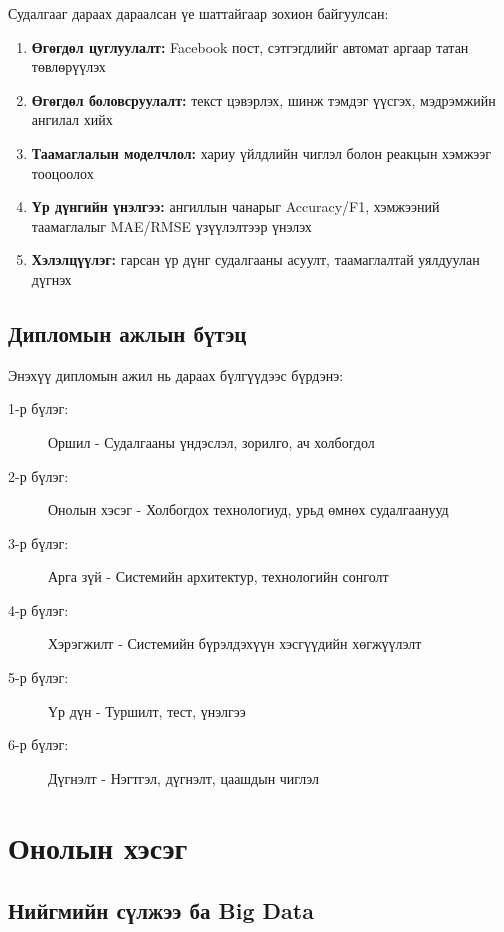 \documentclass[12pt,a4paper]{report}
\begin{document}
Судалгааг дараах дараалсан үе шаттайгаар зохион байгуулсан:

\begin{enumerate}
    \item \textbf{Өгөгдөл цуглуулалт:} Facebook пост, сэтгэгдлийг автомат аргаар татан төвлөрүүлэх
    \item \textbf{Өгөгдөл боловсруулалт:} текст цэвэрлэх, шинж тэмдэг үүсгэх, мэдрэмжийн ангилал хийх
    \item \textbf{Таамаглалын моделчлол:} хариу үйлдлийн чиглэл болон реакцын хэмжээг тооцоолох
    \item \textbf{Үр дүнгийн үнэлгээ:} ангиллын чанарыг Accuracy/F1, хэмжээний таамаглалыг MAE/RMSE үзүүлэлтээр үнэлэх
    \item \textbf{Хэлэлцүүлэг:} гарсан үр дүнг судалгааны асуулт, таамаглалтай уялдуулан дүгнэх
\end{enumerate}

\section{Дипломын ажлын бүтэц}

Энэхүү дипломын ажил нь дараах бүлгүүдээс бүрдэнэ:

\begin{description}
    \item[1-р бүлэг:] Оршил - Судалгааны үндэслэл, зорилго, ач холбогдол
    \item[2-р бүлэг:] Онолын хэсэг - Холбогдох технологиуд, урьд өмнөх судалгаанууд
    \item[3-р бүлэг:] Арга зүй - Системийн архитектур, технологийн сонголт
    \item[4-р бүлэг:] Хэрэгжилт - Системийн бүрэлдэхүүн хэсгүүдийн хөгжүүлэлт
    \item[5-р бүлэг:] Үр дүн - Туршилт, тест, үнэлгээ
    \item[6-р бүлэг:] Дүгнэлт - Нэгтгэл, дүгнэлт, цаашдын чиглэл
\end{description}

\chapter{Онолын хэсэг}

\section{Нийгмийн сүлжээ ба Big Data}
\end{document}
